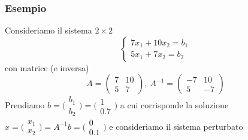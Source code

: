 \subsubsection*{Esempio}
Consideriamo il sistema $2\times 2$
\begin{equation*}
    \begin{cases}
        7x_1 + 10x_2 = b_1\\ 
        5x_1 + 7x_2 = b_2
    \end{cases}
\end{equation*}
con matrice (e inversa)
\begin{equation*}
    A=\begin{pmatrix}
        7 & 10 \\
        5 & 7
    \end{pmatrix}, \
    A^{-1}=\begin{pmatrix}
        -7 & 10 \\
        5 & -7 
    \end{pmatrix}
\end{equation*}
Prendiamo 
    $b=\bigl(\begin{smallmatrix}
    b_1 \\
    b_2
\end{smallmatrix}\bigr) = \bigl(\begin{smallmatrix}
    1 \\
    0.7
\end{smallmatrix}\bigr)$
     a cui corrisponde la soluzione $
x=\bigl(\begin{smallmatrix}
    x_1 \\
    x_2
\end{smallmatrix}\bigr) =A^{-1}b=\bigl(\begin{smallmatrix}
    0 \\
    0.1
\end{smallmatrix}\bigr)
$
 e consideriamo il sistema perturbato 

